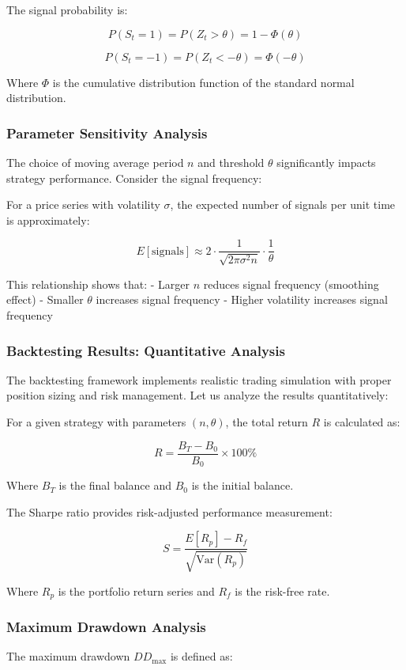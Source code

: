 \documentclass[12pt,a4paper]{article}
\begin{document}
The signal probability is:

\[
P(S_t = 1) = P\left(Z_t > \theta\right) = 1 - \Phi(\theta)
\]

\[
P(S_t = -1) = P\left(Z_t < -\theta\right) = \Phi(-\theta)
\]

Where \( \Phi \) is the cumulative distribution function of the standard normal distribution.

\subsubsection{Parameter Sensitivity Analysis}
The choice of moving average period \( n \) and threshold \( \theta \) significantly impacts strategy performance. Consider the signal frequency:

For a price series with volatility \( \sigma \), the expected number of signals per unit time is approximately:

\[
E[\text{signals}] \approx 2 \cdot \frac{1}{\sqrt{2\pi \sigma^2 n}} \cdot \frac{1}{\theta}
\]

This relationship shows that:
- Larger \( n \) reduces signal frequency (smoothing effect)
- Smaller \( \theta \) increases signal frequency
- Higher volatility increases signal frequency

\subsubsection{Backtesting Results: Quantitative Analysis}

The backtesting framework implements realistic trading simulation with proper position sizing and risk management. Let us analyze the results quantitatively:

For a given strategy with parameters \( (n, \theta) \), the total return \( R \) is calculated as:

\[
R = \frac{B_T - B_0}{B_0} \times 100\%
\]

Where \( B_T \) is the final balance and \( B_0 \) is the initial balance.

The Sharpe ratio provides risk-adjusted performance measurement:

\[
S = \frac{E[R_p] - R_f}{\sqrt{\text{Var}(R_p)}}
\]

Where \( R_p \) is the portfolio return series and \( R_f \) is the risk-free rate.

\subsubsection{Maximum Drawdown Analysis}
The maximum drawdown \( DD_{\max} \) is defined as:
\end{document}
